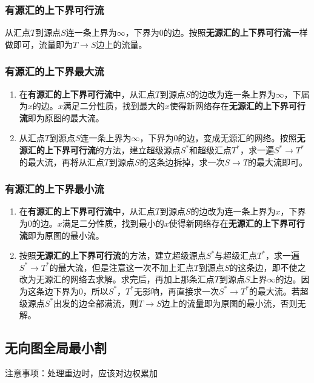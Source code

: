 \documentclass[landscape,a4paper]{article}
\begin{document}
\begin{spacing}{0.3}
\begin{multicols}{2}
\subsubsection{有源汇的上下界可行流}

从汇点$T$到源点$S$连一条上界为$\infty$，下界为$0$的边。按照\textbf{无源汇的上下界可行流}一样做即可，流量即为$T \rightarrow S$边上的流量。

\subsubsection{有源汇的上下界最大流}

\begin{enumerate}
	\item 在\textbf{有源汇的上下界可行流}中，从汇点$T$到源点$S$的边改为连一条上界为$\infty$，下届为$x$的边。$x$满足二分性质，找到最大的$x$使得新网络存在\textbf{无源汇的上下界可行流}即为原图的最大流。
	\item 从汇点$T$到源点$S$连一条上界为$\infty$，下界为$0$的边，变成无源汇的网络。按照\textbf{无源汇的上下界可行流}的方法，建立超级源点$S^*$和超级汇点$T^*$，求一遍$S^* \rightarrow T^*$的最大流，再将从汇点$T$到源点$S$的这条边拆掉，求一次$S \rightarrow T$的最大流即可。
\end{enumerate}

\subsubsection{有源汇的上下界最小流}

\begin{enumerate}
	\item 在\textbf{有源汇的上下界可行流}中，从汇点$T$到源点$S$的边改为连一条上界为$x$，下界为$0$的边。$x$满足二分性质，找到最小的$x$使得新网络存在\textbf{无源汇的上下界可行流}即为原图的最小流。
	\item 按照\textbf{无源汇的上下界可行流}的方法，建立超级源点$S^*$与超级汇点$T^*$，求一遍$S^* \rightarrow T^*$的最大流，但是注意这一次不加上汇点$T$到源点$S$的这条边，即不使之改为无源汇的网络去求解。求完后，再加上那条汇点$T$到源点$S$上界$\infty$的边。因为这条边下界为$0$，所以$S^*$，$T^*$无影响，再直接求一次$S^* \rightarrow T^*$的最大流。若超级源点$S^*$出发的边全部满流，则$T \rightarrow S$边上的流量即为原图的最小流，否则无解。
\end{enumerate}

	\subsection{无向图全局最小割}
	注意事项：处理重边时，应该对边权累加
	


\end{multicols}
\end{spacing}
\end{document}
